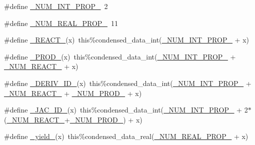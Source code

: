 \begin{DoxyCompactItemize}
\item 
\#define \mbox{\hyperlink{rxn__troe_8_f90_a54f7194dc6a244f7eb7a78f88b3362ba}{\+\_\+\+N\+U\+M\+\_\+\+I\+N\+T\+\_\+\+P\+R\+O\+P\+\_\+}}~2
\item 
\#define \mbox{\hyperlink{rxn__troe_8_f90_a242fac7fe42c0d62936c65735dc023a6}{\+\_\+\+N\+U\+M\+\_\+\+R\+E\+A\+L\+\_\+\+P\+R\+O\+P\+\_\+}}~11
\item 
\#define \mbox{\hyperlink{rxn__troe_8_f90_a2465fb6c1cce932a0bb29dac2975ee64}{\+\_\+\+R\+E\+A\+C\+T\+\_\+}}(x)~this\%condensed\+\_\+data\+\_\+int(\mbox{\hyperlink{sub__model___u_n_i_f_a_c_8_f90_a54f7194dc6a244f7eb7a78f88b3362ba}{\+\_\+\+N\+U\+M\+\_\+\+I\+N\+T\+\_\+\+P\+R\+O\+P\+\_\+}} + x)
\item 
\#define \mbox{\hyperlink{rxn__troe_8_f90_ad730666d44e45e220232510d9e15ec79}{\+\_\+\+P\+R\+O\+D\+\_\+}}(x)~this\%condensed\+\_\+data\+\_\+int(\mbox{\hyperlink{sub__model___u_n_i_f_a_c_8_f90_a54f7194dc6a244f7eb7a78f88b3362ba}{\+\_\+\+N\+U\+M\+\_\+\+I\+N\+T\+\_\+\+P\+R\+O\+P\+\_\+}} + \mbox{\hyperlink{rxn__troe_8_f90_aee1fee52189b85b8a55162815b7eb2ab}{\+\_\+\+N\+U\+M\+\_\+\+R\+E\+A\+C\+T\+\_\+}} + x)
\item 
\#define \mbox{\hyperlink{rxn__troe_8_f90_a8df20fa2e866ca68998160fdeef08b19}{\+\_\+\+D\+E\+R\+I\+V\+\_\+\+I\+D\+\_\+}}(x)~this\%condensed\+\_\+data\+\_\+int(\mbox{\hyperlink{sub__model___u_n_i_f_a_c_8_f90_a54f7194dc6a244f7eb7a78f88b3362ba}{\+\_\+\+N\+U\+M\+\_\+\+I\+N\+T\+\_\+\+P\+R\+O\+P\+\_\+}} + \mbox{\hyperlink{rxn__troe_8_f90_aee1fee52189b85b8a55162815b7eb2ab}{\+\_\+\+N\+U\+M\+\_\+\+R\+E\+A\+C\+T\+\_\+}} + \mbox{\hyperlink{rxn__troe_8_f90_a0ab2d7e00e334b5c52335f26ef6025e8}{\+\_\+\+N\+U\+M\+\_\+\+P\+R\+O\+D\+\_\+}} + x)
\item 
\#define \mbox{\hyperlink{rxn__troe_8_f90_af0ecfa7b0240c903b78101cd3e4ac0c7}{\+\_\+\+J\+A\+C\+\_\+\+I\+D\+\_\+}}(x)~this\%condensed\+\_\+data\+\_\+int(\mbox{\hyperlink{sub__model___u_n_i_f_a_c_8_f90_a54f7194dc6a244f7eb7a78f88b3362ba}{\+\_\+\+N\+U\+M\+\_\+\+I\+N\+T\+\_\+\+P\+R\+O\+P\+\_\+}} + 2$\ast$(\mbox{\hyperlink{rxn__troe_8_f90_aee1fee52189b85b8a55162815b7eb2ab}{\+\_\+\+N\+U\+M\+\_\+\+R\+E\+A\+C\+T\+\_\+}}+\mbox{\hyperlink{rxn__troe_8_f90_a0ab2d7e00e334b5c52335f26ef6025e8}{\+\_\+\+N\+U\+M\+\_\+\+P\+R\+O\+D\+\_\+}}) + x)
\item 
\#define \mbox{\hyperlink{rxn__troe_8_f90_a767b378bc7f42ea6f251cd44b8bc09da}{\+\_\+yield\+\_\+}}(x)~this\%condensed\+\_\+data\+\_\+real(\mbox{\hyperlink{sub__model___u_n_i_f_a_c_8_f90_a242fac7fe42c0d62936c65735dc023a6}{\+\_\+\+N\+U\+M\+\_\+\+R\+E\+A\+L\+\_\+\+P\+R\+O\+P\+\_\+}} + x)
\end{DoxyCompactItemize}
